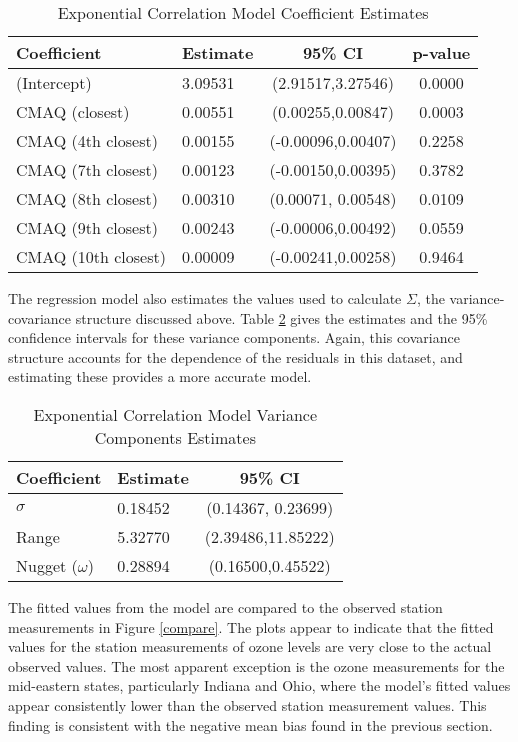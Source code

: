 \documentclass{svproc}
\begin{document}
\begin{table}[H]
\begin{center}
\caption{Exponential Correlation Model Coefficient Estimates}
\begin{tabular}{l | l c c }
\hline
Coefficient &  Estimate  &   95\% CI & p-value \\
\hline
(Intercept)  &    3.09531 & (2.91517,3.27546) & 0.0000 \\
CMAQ (closest) & 0.00551 & (0.00255,0.00847) & 0.0003 \\
CMAQ (4th closest) &  0.00155 & (-0.00096,0.00407) & 0.2258 \\
CMAQ (7th closest) &  0.00123 & (-0.00150,0.00395) & 0.3782 \\
CMAQ (8th closest) &  0.00310 & (0.00071, 0.00548) & 0.0109 \\
CMAQ (9th closest) &  0.00243 & (-0.00006,0.00492) & 0.0559 \\
CMAQ (10th closest) &  0.00009 & (-0.00241,0.00258) & 0.9464 \\
\hline
\end{tabular}
\label{coef}
\end{center}
\end{table}

The regression model also estimates the values used to calculate $\Sigma$, the variance-covariance structure discussed above. Table \ref{corcoef} gives the estimates and the 95\% confidence intervals for these variance components. Again, this covariance structure accounts for the dependence of the residuals in this dataset, and estimating these provides a more accurate model.

\begin{table}[H]
\begin{center}
\caption{Exponential Correlation Model Variance Components Estimates}
\begin{tabular}{l | l c }
\hline
Coefficient &  Estimate  &   95\% CI \\
\hline
$\sigma$ & 0.18452 & (0.14367, 0.23699) \\
Range  &    5.32770 & (2.39486,11.85222) \\
Nugget ($\omega$) & 0.28894 & (0.16500,0.45522) \\
\hline
\end{tabular}
\label{corcoef}
\end{center}
\end{table}

\smallbreak

The fitted values from the model are compared to the observed station measurements in Figure \ref{compare}. The plots appear to indicate that the fitted values for the station measurements of ozone levels are very close to the actual observed values. The most apparent exception is the ozone measurements for the mid-eastern states, particularly Indiana and Ohio, where the model's fitted values appear consistently lower than the observed station measurement values. This finding is consistent with the negative mean bias found in the previous section.  
\end{document}
